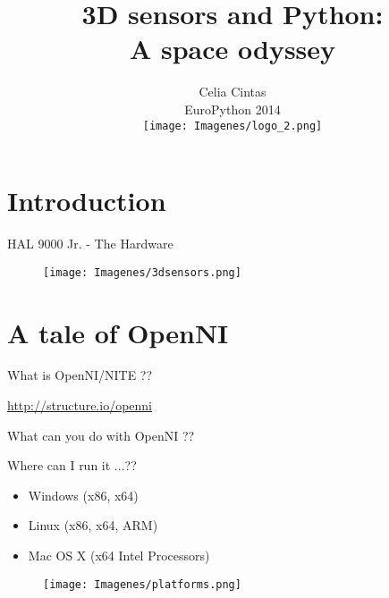 \documentclass[bigger]{beamer}
\begin{document}
\normalfont\ECFAugie

\title{3D sensors and Python:\\ A space odyssey \\[0.5cm]}
\subtitle{Celia Cintas \\[0.2cm] EuroPython 2014 \\[0.3cm]
\texttt{[image: Imagenes/logo\_2.png]}}
\date{}
\begin{frame}
\titlepage
\end{frame}
\section{Introduction}


\begin{frame}[t]{\ECFAugie HAL 9000 Jr. - The Hardware}
\begin{figure}
		\texttt{[image: Imagenes/3dsensors.png]}
\end{figure}
\end{frame}

\section{A tale of OpenNI}
\begin{frame}[fragile]{\ECFAugie What is OpenNI/NITE ??}
\begin{center}
\url{http://structure.io/openni}
\end{center}
\end{frame}

\begin{frame}{\ECFAugie What can you do with OpenNI ??}
\end{frame}

\begin{frame}{\ECFAugie Where can I run it ...??}
\begin{minipage}{0.47\textwidth}
\begin{itemize}
	\item Windows (x86, x64)
	\item Linux (x86, x64, ARM)
	\item Mac OS X (x64 Intel Processors)
\end{itemize}
\end{minipage}
\begin{minipage}{0.5\textwidth}
\begin{figure}[h]
		\texttt{[image: Imagenes/platforms.png]}
\end{figure}
\end{minipage}
\end{frame}
\end{document}

